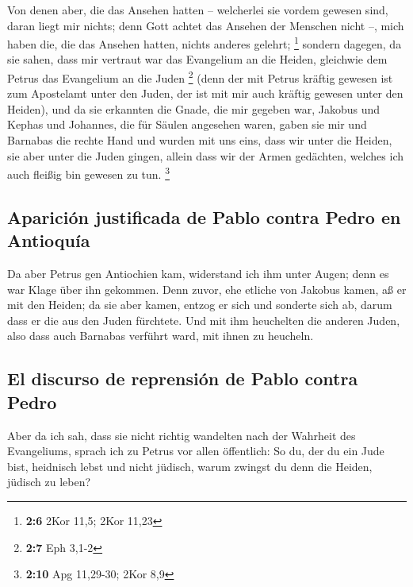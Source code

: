  Von denen aber, die das Ansehen hatten -- welcherlei sie
vordem gewesen sind, daran liegt mir nichts; denn Gott achtet das
Ansehen der Menschen nicht --, mich haben die, die das Ansehen hatten,
nichts anderes gelehrt; \footnote{\textbf{2:6} 2Kor 11,5; 2Kor 11,23}
 sondern dagegen, da sie sahen, dass mir vertraut war das
Evangelium an die Heiden, gleichwie dem Petrus das Evangelium an die
Juden \footnote{\textbf{2:7} Eph 3,1-2}  (denn der mit
Petrus kräftig gewesen ist zum Apostelamt unter den Juden, der ist mit
mir auch kräftig gewesen unter den Heiden),  und da sie
erkannten die Gnade, die mir gegeben war, Jakobus und Kephas und
Johannes, die für Säulen angesehen waren, gaben sie mir und Barnabas die
rechte Hand und wurden mit uns eins, dass wir unter die Heiden, sie aber
unter die Juden gingen,  allein dass wir der Armen
gedächten, welches ich auch fleißig bin gewesen zu tun. \footnote{\textbf{2:10}
  Apg 11,29-30; 2Kor 8,9}

\hypertarget{apariciuxf3n-justificada-de-pablo-contra-pedro-en-antioquuxeda}{%
\subsection{Aparición justificada de Pablo contra Pedro en
Antioquía}\label{apariciuxf3n-justificada-de-pablo-contra-pedro-en-antioquuxeda}}

 Da aber Petrus gen Antiochien kam, widerstand ich ihm
unter Augen; denn es war Klage über ihn gekommen.  Denn
zuvor, ehe etliche von Jakobus kamen, aß er mit den Heiden; da sie aber
kamen, entzog er sich und sonderte sich ab, darum dass er die aus den
Juden fürchtete.  Und mit ihm heuchelten die anderen
Juden, also dass auch Barnabas verführt ward, mit ihnen zu heucheln.

\hypertarget{el-discurso-de-reprensiuxf3n-de-pablo-contra-pedro}{%
\subsection{El discurso de reprensión de Pablo contra
Pedro}\label{el-discurso-de-reprensiuxf3n-de-pablo-contra-pedro}}

 Aber da ich sah, dass sie nicht richtig wandelten nach
der Wahrheit des Evangeliums, sprach ich zu Petrus vor allen öffentlich:
So du, der du ein Jude bist, heidnisch lebst und nicht jüdisch, warum
zwingst du denn die Heiden, jüdisch zu leben?

